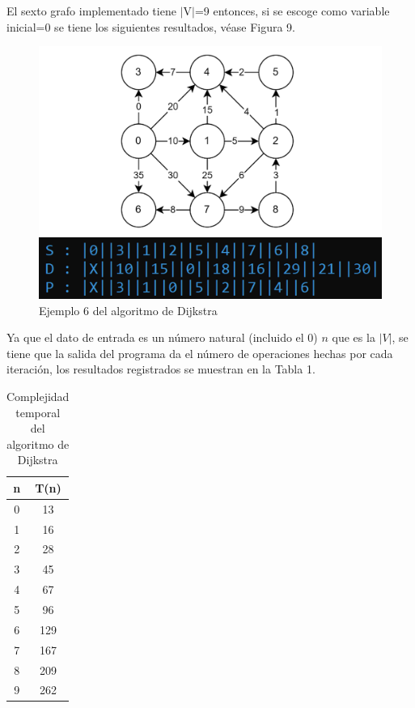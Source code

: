 \documentclass[12pt,twoside]{article}
\begin{document}
    El sexto grafo implementado tiene $|$V$|$=9 entonces, si se escoge como variable inicial=0 se tiene los siguientes resultados, v\'ease Figura 9.
    \begin{figure}[H]
        \centering
        \includegraphics{imagenes/Imagen6.png}
        \caption{Ejemplo 6 del algoritmo de Dijkstra}
    \end{figure}
    Ya que el dato de entrada es un n\'umero natural (incluido el 0) $n$ que es la $|V|$,  se tiene que la salida del programa da el n\'umero de operaciones hechas por cada iteraci\'on, los resultados registrados se muestran en la Tabla 1.
    \begin{longtable}{||c|c||}
        \caption{Complejidad temporal del algoritmo de Dijkstra}\\
            \hline
                \textbf{n}&\textbf{T(n)}\\
            \hline
                {0}&{13}\\
            \hline
                {1}&{16}\\
            \hline
                {2}&{28}\\
            \hline
                {3}&{45}\\
            \hline
                {4}&{67}\\
            \hline
                {5}&{96}\\
            \hline
                {6}&{129}\\
            \hline
                {7}&{167}\\
            \hline
                {8}&{209}\\
            \hline
                {9}&{262}\\
            \hline
    \end{longtable}
\end{document}

